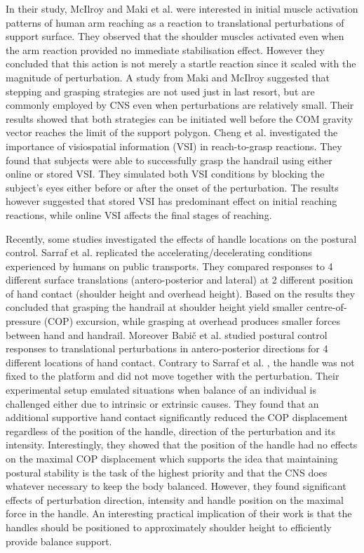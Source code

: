 \documentclass[12pt,a4paper,twoside]{article}
\begin{document}
In their study, McIlroy and Maki et al. \cite{Mcllroy1995b} were interested in initial muscle activation patterns of human arm reaching as a reaction to translational perturbations of support surface. They observed that the shoulder muscles activated even when the arm reaction provided no immediate stabilisation effect. However they concluded that this action is not merely a startle reaction since it scaled with the magnitude of perturbation. A study from Maki and McIlroy \cite{Maki1997} suggested that stepping and grasping strategies are not used just in last resort, but are commonly employed by CNS even when perturbations are relatively small. Their results showed that both strategies can be initiated well before the COM gravity vector reaches the limit of the support polygon. Cheng et al. \cite{Cheng2012} investigated the importance of visiospatial information (VSI) in reach-to-grasp reactions. They found that subjects were able to successfully grasp the handrail using either online or stored VSI. They simulated both VSI conditions by blocking the subject's eyes either before or after the onset of the perturbation. The results however suggested that stored VSI has predominant effect on initial reaching reactions, while online VSI affects the final stages of reaching.

Recently, some studies investigated the effects of handle locations on the postural control. Sarraf et al. \cite{Sarraf2014} replicated the accelerating/decelerating conditions experienced by humans on public transports. They compared responses to 4 different surface translations (antero-posterior and lateral) at 2 different position of hand contact (shoulder height and overhead height). Based on the results they concluded that grasping the handrail at shoulder height yield smaller centre-of-pressure (COP) excursion, while grasping at overhead produces smaller forces between hand and handrail. Moreover Babi\v{c} et al. \cite{Babic2014} studied postural control responses to translational perturbations in antero-posterior directions for 4 different locations of hand contact. Contrary to Sarraf et al. \cite{Sarraf2014}, the handle was not fixed to the platform and did not move together with the perturbation. Their experimental setup emulated situations when balance of an individual is challenged either due to intrinsic or extrinsic causes. They found that an additional supportive hand contact significantly reduced the COP displacement regardless of the position of the handle, direction of the perturbation and its intensity. Interestingly, they showed that the position of the handle had no effects on the maximal COP displacement which supports the idea that maintaining postural stability is the task of the highest priority and that the CNS does whatever necessary to keep the body balanced. However, they found significant effects of perturbation direction, intensity and handle position on the maximal force in the handle. An interesting practical implication of their work is that the handles should be positioned to approximately shoulder height to efficiently provide balance support.
\end{document}
